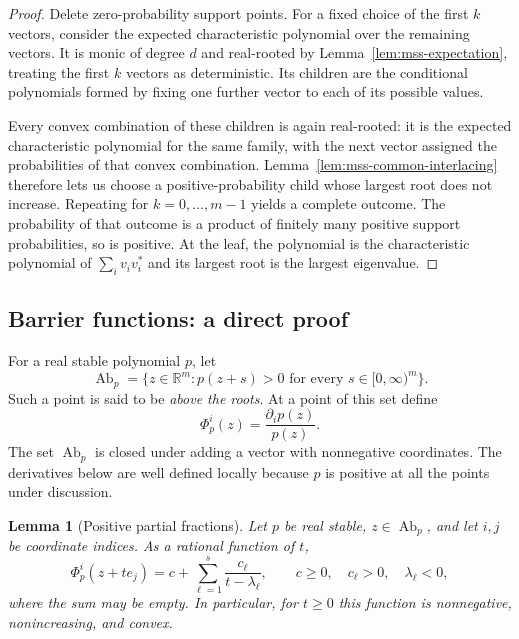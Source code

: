 \documentclass[11pt]{amsart}
\newtheorem{lemma}[theorem]{Lemma}
\theoremstyle{definition}
\theoremstyle{remark}
\numberwithin{equation}{section}
\begin{document}
\begin{proof}
Delete zero-probability support points.  For a fixed choice of the
first $k$ vectors, consider the expected characteristic polynomial
over the remaining vectors.  It is monic of degree $d$ and
real-rooted by Lemma~\ref{lem:mss-expectation}, treating the first
$k$ vectors as deterministic.  Its children are the conditional
polynomials formed by fixing one further vector to each of its
possible values.

Every convex combination of these children is again real-rooted:
it is the expected characteristic polynomial for the same family,
with the next vector assigned the probabilities of that convex
combination.  Lemma~\ref{lem:mss-common-interlacing} therefore lets
us choose a positive-probability child whose largest root does not
increase.  Repeating for $k=0,\ldots,m-1$ yields a complete outcome.
The probability of that outcome is a product of finitely many
positive support probabilities, so is positive.  At the leaf, the
polynomial is the characteristic polynomial of
$\sum_i v_iv_i^*$ and its largest root is the largest eigenvalue.
\end{proof}

\subsection{Barrier functions: a direct proof}

For a real stable polynomial $p$, let
\[
 \operatorname{Ab}_p
 =\{z\in\mathbb R^m:p(z+s)>0
                    \text{ for every }s\in[0,\infty)^m\}.
\]
Such a point is said to be \emph{above the roots}.  At a point of
this set define
\[
 \Phi_p^i(z)=\frac{\partial_i p(z)}{p(z)}.
\]
The set $\operatorname{Ab}_p$ is closed under adding a vector with
nonnegative coordinates.  The derivatives below are well defined
locally because $p$ is positive at all the points under discussion.

\begin{lemma}[Positive partial fractions]
\label{lem:mss-partial-fractions}
Let $p$ be real stable, $z\in\operatorname{Ab}_p$, and let $i,j$ be
coordinate indices.  As a rational function of $t$,
\begin{equation}
 \Phi_p^i(z+te_j)
 =c+\sum_{\ell=1}^s\frac{c_\ell}{t-\lambda_\ell},
 \qquad c\geq0,\quad c_\ell>0,\quad\lambda_\ell<0,
 \label{eq:mss-positive-partial-fractions}
\end{equation}
where the sum may be empty.  In particular, for $t\geq0$ this
function is nonnegative, nonincreasing, and convex.
\end{lemma}
\end{document}
